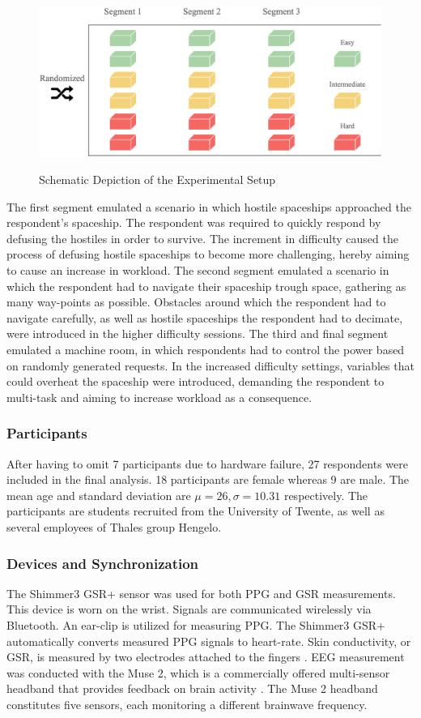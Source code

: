 \documentclass[12pt]{article}
\begin{document}
\begin{figure}
\caption{Schematic Depiction of the Experimental Setup}
\bigskip
\includegraphics[scale=0.35]{experimental_setup}
\label{fig:experimental}
\bigskip
\end{figure}

The first segment emulated a scenario in which hostile spaceships approached the respondent's spaceship. The respondent was required to quickly respond by defusing the hostiles in order to survive. The increment in difficulty caused the process of defusing hostile spaceships to become more challenging, hereby aiming to cause an increase in workload. The second segment emulated a scenario in which the respondent had to navigate their spaceship trough space, gathering as many way-points as possible. Obstacles around which the respondent had to navigate carefully, as well as hostile spaceships the respondent had to decimate, were introduced in the higher difficulty sessions. The third and final segment emulated a machine room, in which respondents had to control the power based on randomly generated requests. In the increased difficulty settings, variables that could overheat the spaceship were introduced, demanding the respondent to multi-task and aiming to increase workload as a consequence.

\subsubsection{Participants}
After having to omit 7 participants due to hardware failure, 27 respondents were included in the final analysis.  18 participants are female whereas 9 are male. The mean age and standard deviation are $\mu =26, \sigma = 10.31$ respectively. The participants are students recruited from the University of Twente, as well as several employees of Thales group Hengelo. 

\subsubsection{Devices and Synchronization}
The Shimmer3 GSR+ sensor was used for both PPG and GSR measurements. This device is worn on the wrist. Signals are communicated wirelessly via Bluetooth. An ear-clip is utilized for measuring PPG. The Shimmer3 GSR+ automatically converts measured PPG signals to heart-rate. Skin conductivity, or GSR, is measured by two electrodes attached to the fingers \cite{shimmer}. EEG measurement was conducted with the Muse 2, which is a commercially offered multi-sensor headband that provides feedback on brain activity \cite{muse}. The Muse 2 headband constitutes five sensors, each monitoring a different brainwave frequency.  
\end{document}

